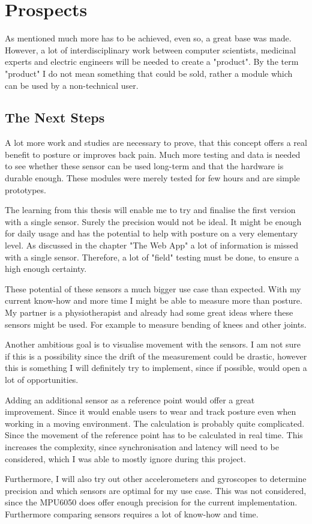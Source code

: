 \chapter*{Prospects}
\label{chap:Porspects}
\setcounter{section}{0}

As mentioned much more has to be achieved, even so, a great base was made. However, a lot of interdisciplinary work between computer scientists, medicinal experts and electric engineers will be needed to create a "product". By the term "product" I do not mean something that could be sold, rather a module which can be used by a non-technical user.

\section{The Next Steps}

A lot more work and studies are necessary to prove, that this concept offers a real benefit to posture or improves back pain. Much more testing and data is needed to see whether these sensor can be used long-term and that the hardware is durable enough. These modules were merely tested for few hours and are simple prototypes.

The learning from this thesis will enable me to try and finalise the first version with a single sensor. Surely the precision would not be ideal. It might be enough for daily usage and has the potential to help with posture on a very elementary level. As discussed in the chapter "The Web App" a lot of information is missed with a single sensor.
Therefore, a lot of "field" testing must be done, to ensure a high enough certainty.

These potential of these sensors a much bigger use case than expected. With my current know-how and more time I might be able to measure more than posture. My partner is a physiotherapist and already had some great ideas where these sensors might be used. For example to measure bending of knees and other joints. 

Another ambitious goal is to visualise movement with the sensors. I am not sure if this is a possibility since the drift of the measurement could be drastic, however this is something I will definitely try to implement, since if possible, would open a lot of opportunities.

Adding an additional sensor as a reference point would offer a great improvement. Since it would enable users to wear and track posture even when working in a moving environment. The calculation  is probably quite complicated. Since the movement of the reference point has to be calculated in real time. This increases the complexity, since synchronisation and latency will need to be considered, which I was able to mostly ignore during this project.

Furthermore, I will also try out other accelerometers and gyroscopes to determine precision and which sensors are optimal for my use case. This was not considered, since the MPU6050 does offer enough precision for the current implementation. Furthermore comparing sensors requires a lot of know-how and time.